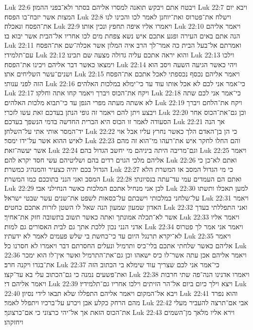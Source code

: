 Luk 22:6  ויבטח אתם ויבקש תואנה למסרו אליהם בסתר ולא־בפני ההמון׃
Luk 22:7  ויבא יום המצות אשר יזבח־בו הפסח׃
Luk 22:8  וישלח את־פטרוס ואת־יוחנן לאמר לכו והכינו לנו את־הפסח ונאכלה׃
Luk 22:9  ויאמרו אליו איפה תחפץ ונכין אותו׃
Luk 22:10  ויאמר אליהם הנה אתם באים העירה ופגע אתכם איש נשא צפחת מים לכו אחריו אל־הבית אשר יבוא בו׃
Luk 22:11  ואמרתם אל־בעל הבית כה אמר־לך הרב איה המלון אשר אכלה־שם את־הפסח עם־תלמידי׃
Luk 22:12  והוא יראה אתכם עליה גדולה מצעה שם תכינו׃
Luk 22:13  וילכו וימצאו כאשר דבר אליהם ויכינו את־הפסח׃
Luk 22:14  ויהי כאשר הגיעה השעה ויסב הוא ושנים־עשר השליחים אתו׃
Luk 22:15  ויאמר אליהם נכסף נכספתי לאכל אתכם את־הפסח הזה לפני ענותי׃
Luk 22:16  כי־אמר אני לכם לא אכל אותו עוד עד כי־ימלא במלכות האלהים׃
Luk 22:17  ויקח את־הכוס ויברך ויאמר קחו אתה וחלקו׃
Luk 22:18  כי־אמר אני לכם שתה לא אשתה מעתה מפרי הגפן עד כי־תבוא מלכות האלהים׃
Luk 22:19  ויקח את־הלחם ויברך ויבצע ויתן להם ויאמר זה גופי הנתן בעדכם זאת עשו לזכרי׃
Luk 22:20  וכן גם־את־הכוס אחר הסעודה לאמר זו הכוס היא הברית החדשה בדמי הנשפך בעדכם׃
Luk 22:21  אך הנה יד־המסר אותי אתי על־השלחן׃
Luk 22:22  כי הן בן־האדם הלך כאשר נחרץ עליו אבל אוי לאיש ההוא אשר על־ידו ימסר׃
Luk 22:23  והם החלו לחקר איש את־רעהו מי־הוא זה מהם אשר יעשה־זאת׃
Luk 22:24  וגם־מריבה היתה ביניהם מי יחשב הגדול בהם׃
Luk 22:25  ויאמר אליהם מלכי הגוים רדים בהם ושליטיהם עשי חסד יקרא להם׃
Luk 22:26  ואתם לא־כן כי הגדול בכם יהיה כצעיר והמנהיג כמשרת׃
Luk 22:27  כי מי הגדול המסב או המשרת הלא המסב ואני הנני בתוככם כמו המשרת׃
Luk 22:28  ואתם הם העמדים עמי עד־עתה בנסיונתי׃
Luk 22:29  לכן אני מנחיל אתכם המלכות כאשר הנחילני אבי׃
Luk 22:30  למען תאכלו ותשתו על־שלחני במלכותי וישבתם על־כסאות לשפט את־שנים עשר שבטי ישראל׃
Luk 22:31  ויאמר האדון שמעון שמעון הנה שאל לו השטן לזרות אתכם כחטים׃
Luk 22:32  ואני התפללתי בעדך אשר לא־תכלה אמונתך ואתה כאשר תשוב בתשובה חזק את־אחיך׃
Luk 22:33  ויאמר אליו אדני הנני נכון ללכת אתך גם לבית האסורים גם למות׃
Luk 22:34  ויאמר אני אמר לך פטרוס לא־יקרא תרנגל היום עד כי־כחשת בי שלש פעמים לאמר לא ידעתיו׃
Luk 22:35  ויאמר אליהם כאשר שלחתי אתכם בלי־כיס ותרמיל ונעלים החסרתם דבר ויאמרו לא חסרנו כל׃
Luk 22:36  ויאמר אליהם אכן עתה אשר־לו כיס ישאהו וכן גם־את־התרמיל ואשר אין־לו הוא ימכר את־בגדו ויקנה חרב׃
Luk 22:37  כי־אמר אני לכם שצריך עוד שימלא בי הכתוב הזה ואת־פשעים נמנה כי גם־הכתוב עלי בא עד־קצו׃
Luk 22:38  ויאמרו אדנינו הנה־פה שתי חרבות ויאמר אליהם די׃
Luk 22:39  ויצא וילך כיום ביום אל־הר הזיתים וילכו אחריו גם־תלמידיו׃
Luk 22:40  ויבא אל־המקום ויאמר אליהם התפללו שלא תבאו לידי נסיון׃
Luk 22:41  והוא נפרד מהם הרחק כקלע אבן ויכרע על־ברכיו ויתפלל לאמר׃
Luk 22:42  אבי אם־תרצה להעביר מעלי את־הכוס הזאת אך אל־יהי כרצוני כי אם־כרצונך׃
Luk 22:43  וירא אליו מלאך מן־השמים ויחזקהו׃
